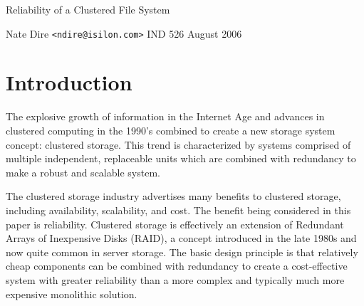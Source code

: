 \documentclass[11pt]{article}
\numberwithin{equation}{section}
\begin{document}
\begin{titlepage}
  \begin{center}
      {\LARGE Reliability of a Clustered File System}
    \linebreak

    {\Large Nate Dire}
    \linebreak
    {\small \texttt{<ndire@isilon.com>}}
    \linebreak
    \linebreak
    IND 526
    \linebreak
    August 2006
    \linebreak

  \end{center}


  \begin{abstract}
  This document evaluates the reliability of a particular clustered file
  system model. A basic knowledge of probability and reliability is assumed;
  advanced techniques are introduced before application.  The model considered
  here is that of a homogeneous group of servers, each containing the same
  number of drives, with node-wise redundancy, effectively a repairable
  $k$-out-of-$n$:G system.  Two methods of evaluation are compared for
  accuracy.
  \end{abstract}


\end{titlepage}

\setcounter{page}{2}

\clearpage \tableofcontents \clearpage


\section{Introduction}

The explosive growth of information in the Internet Age and advances in
clustered computing in the 1990's combined to create a new storage system
concept: clustered storage.  This trend is characterized by systems comprised
of multiple independent, replaceable units which are combined with redundancy
to make a robust and scalable system.

The clustered storage industry advertises many benefits to clustered storage,
including availability, scalability, and cost.  The benefit being considered
in this paper is reliability.  Clustered storage is effectively an extension
of Redundant Arrays of Inexpensive Disks (RAID), a concept introduced in the
late 1980s and now quite common in server storage.  The basic design principle
is that relatively cheap components can be combined with redundancy to create
a cost-effective system with greater reliability than a more complex and
typically much more expensive monolithic solution.
\end{document}
